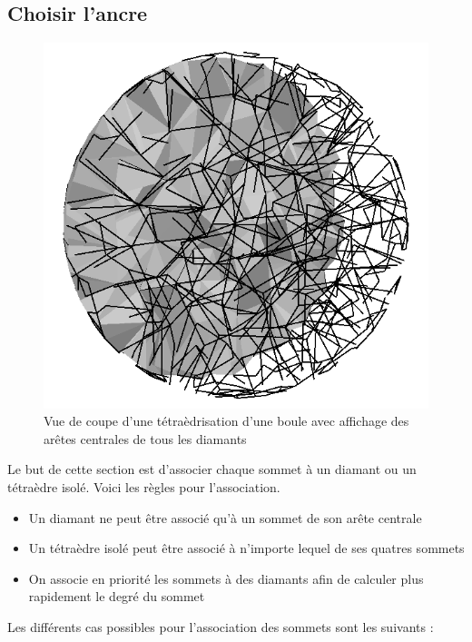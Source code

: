 \subsection{Choisir l'ancre}
\label{ancrage}
\noindent
\begin{figure}[H]
\begin{center}
\includegraphics[scale=0.2]{Images/central_edges}
\caption{Vue de coupe d'une tétraèdrisation d'une boule avec affichage des arêtes centrales de tous les diamants}
\label{fig:central_edges}
\end{center}
\end{figure}
\noindent
Le but de cette section est d'associer chaque sommet à un diamant ou un tétraèdre isolé. Voici les règles pour l'association.\\
\begin{itemize}
\item Un diamant ne peut être associé qu'à un sommet de son arête centrale
\item Un tétraèdre isolé peut être associé à n'importe lequel de ses quatres sommets
\item On associe en priorité les sommets à des diamants afin de calculer plus rapidement le degré du sommet\\
\end{itemize}
Les différents cas possibles pour l'association des sommets sont les suivants :\\
